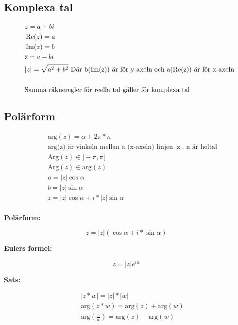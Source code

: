 \begin{multicols}{2}
\section{Komplexa tal}
\begin{align*}
&\quad z = a + bi \\
&\quad \operatorname{Re}(z) = a \\
&\quad \operatorname{Im}(z) = b \\
&\quad \overline{\rm z}= a - b i \\
&\quad | z | = \sqrt{a^ { 2 } + b^ { 2 }} \text{  Där b(Im(z)) är för y-axeln och a(Re(z)) är för x-axeln} \\
&\quad  \\
&\quad \text{Samma räkneregler för reella tal gäller för komplexa tal} \\
\end{align*}


\subsection{Polärform}
\begin{align*}
  &\quad \text{arg}(z) = \alpha + 2\pi * n \\
  &\quad \text{arg(z) är vinkeln mellan a (x-axeln) linjen |z|. n är heltal}  \\
  &\quad \text{Arg}(z) \in ]-\pi, \pi[ \\
    &\quad \text{Arg}(z) \in \text{arg}(z) \\
    &\quad a = |z| \cos{\alpha} \\
    &\quad b = |z| \sin{\alpha} \\
    &\quad z = |z| \cos{\alpha} + i * |z| \sin{\alpha} \\
\end{align*}

\textbf{Polärform:}\par
\begin{equation}
  z = |z|(\cos{\alpha} + i * \sin{\alpha})
\end{equation}

\textbf{Eulers formel:}\par
\begin{equation}
  z = |z|e^{i \alpha}
\end{equation}

\textbf{Sats:}\par
\begin{align*}
  &\quad |z * w| = |z| * |w| \\
  &\quad \text{arg}(z * w) = \text{arg}(z) + \text{arg}(w) \\
  &\quad \text{arg}(\frac{z}{w}) =  \text{arg}(z) - \text{arg}(w)\\
\end{align*}


\end{multicols}
